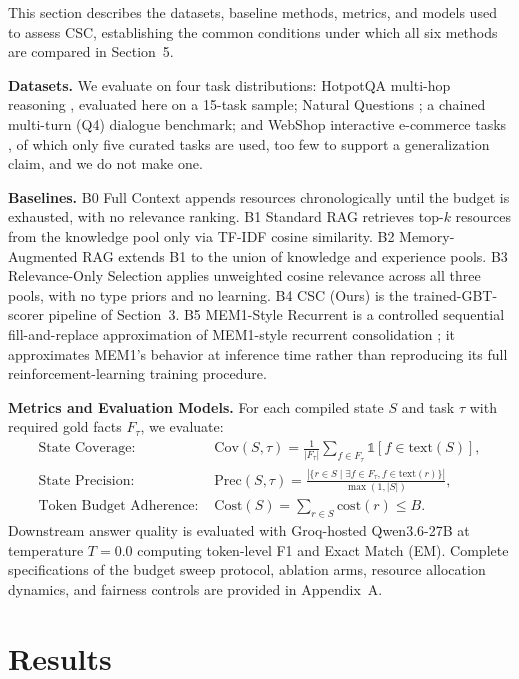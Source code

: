 \documentclass{article}
\begin{document}
This section describes the datasets, baseline methods, metrics, and models used to assess CSC, establishing the common conditions under which all six methods are compared in Section~5.

\textbf{Datasets.} We evaluate on four task distributions: HotpotQA multi-hop reasoning \citep{yang2018hotpotqa}, evaluated here on a 15-task sample; Natural Questions \citep{kwiatkowski2019naturalquestions}; a chained multi-turn (Q4) dialogue benchmark; and WebShop interactive e-commerce tasks \citep{yao2022webshop}, of which only five curated tasks are used, too few to support a generalization claim, and we do not make one.

\textbf{Baselines.} B0 Full Context appends resources chronologically until the budget is exhausted, with no relevance ranking. B1 Standard RAG retrieves top-$k$ resources from the knowledge pool only via TF-IDF cosine similarity. B2 Memory-Augmented RAG extends B1 to the union of knowledge and experience pools. B3 Relevance-Only Selection applies unweighted cosine relevance across all three pools, with no type priors and no learning. B4 CSC (Ours) is the trained-GBT-scorer pipeline of Section~3. B5 MEM1-Style Recurrent is a controlled sequential fill-and-replace approximation of MEM1-style recurrent consolidation \citep{zhou2025mem1}; it approximates MEM1's behavior at inference time rather than reproducing its full reinforcement-learning training procedure.

\textbf{Metrics and Evaluation Models.} For each compiled state $S$ and task $\tau$ with required gold facts $F_\tau$, we evaluate:
\begin{align}
\text{State Coverage: } & \mathrm{Cov}(S, \tau) = \frac{1}{|F_\tau|} \sum_{f \in F_\tau} \mathbb{1}[f \in \mathrm{text}(S)], \label{eq:cov} \\
\text{State Precision: } & \mathrm{Prec}(S, \tau) = \frac{|\{r \in S \mid \exists f \in F_\tau, f \in \mathrm{text}(r)\}|}{\max(1, |S|)}, \label{eq:prec} \\
\text{Token Budget Adherence: } & \mathrm{Cost}(S) = \sum_{r \in S} \mathrm{cost}(r) \leq B. \label{eq:cost}
\end{align}
Downstream answer quality is evaluated with Groq-hosted Qwen3.6-27B at temperature $T=0.0$ computing token-level F1 and Exact Match (EM). Complete specifications of the budget sweep protocol, ablation arms, resource allocation dynamics, and fairness controls are provided in Appendix~A.

\section{Results}
\end{document}
